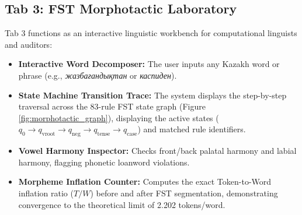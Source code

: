 \subsection{Tab 3: FST Morphotactic Laboratory}
Tab 3 functions as an interactive linguistic workbench for computational linguists and auditors:
\begin{itemize}
    \item \textbf{Interactive Word Decomposer:} The user inputs any Kazakh word or phrase (e.g., \textit{жаз\-ба\-ған\-дық\-тан} or \textit{каспиден}).
    \item \textbf{State Machine Transition Trace:} The system displays the step-by-step traversal across the 83-rule FST state graph (Figure \ref{fig:morphotactic_graph}), displaying the active states ($q_0 \to q_{\text{vroot}} \to q_{\text{neg}} \to q_{\text{tense}} \to q_{\text{case}}$) and matched rule identifiers.
    \item \textbf{Vowel Harmony Inspector:} Checks front/back palatal harmony and labial harmony, flagging phonetic loanword violations.
    \item \textbf{Morpheme Inflation Counter:} Computes the exact Token-to-Word inflation ratio ($T/W$) before and after FST segmentation, demonstrating convergence to the theoretical limit of 2.202 tokens/word.
\end{itemize}

